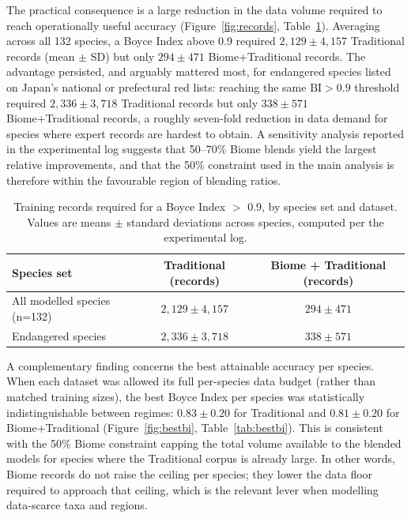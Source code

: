 \documentclass[11pt]{article}
\begin{document}
The practical consequence is a large reduction in the data volume required to reach operationally useful accuracy (Figure~\ref{fig:records}, Table~\ref{tab:records}). Averaging across all 132 species, a Boyce Index above 0.9 required $2{,}129 \pm 4{,}157$ Traditional records (mean $\pm$ SD) but only $294 \pm 471$ Biome+Traditional records. The advantage persisted, and arguably mattered most, for endangered species listed on Japan's national or prefectural red lists: reaching the same $\mathrm{BI} > 0.9$ threshold required $2{,}336 \pm 3{,}718$ Traditional records but only $338 \pm 571$ Biome+Traditional records, a roughly seven-fold reduction in data demand for species where expert records are hardest to obtain. A sensitivity analysis reported in the experimental log suggests that 50--70\% Biome blends yield the largest relative improvements, and that the 50\% constraint used in the main analysis is therefore within the favourable region of blending ratios.

\begin{table}[htbp]
\centering
\caption{Training records required for a Boyce Index $>$ 0.9, by species set and dataset. Values are means $\pm$ standard deviations across species, computed per the experimental log.}
\label{tab:records}
\begin{tabular}{lcc}
\toprule
Species set & Traditional (records) & Biome + Traditional (records) \\
\midrule
All modelled species (n=132) & $2{,}129 \pm 4{,}157$ & $294 \pm 471$ \\
Endangered species           & $2{,}336 \pm 3{,}718$ & $338 \pm 571$ \\
\bottomrule
\end{tabular}
\end{table}

A complementary finding concerns the best attainable accuracy per species. When each dataset was allowed its full per-species data budget (rather than matched training sizes), the best Boyce Index per species was statistically indistinguishable between regimes: $0.83 \pm 0.20$ for Traditional and $0.81 \pm 0.20$ for Biome+Traditional (Figure~\ref{fig:bestbi}, Table~\ref{tab:bestbi}). This is consistent with the 50\% Biome constraint capping the total volume available to the blended models for species where the Traditional corpus is already large. In other words, Biome records do not raise the ceiling per species; they lower the data floor required to approach that ceiling, which is the relevant lever when modelling data-scarce taxa and regions.
\end{document}

